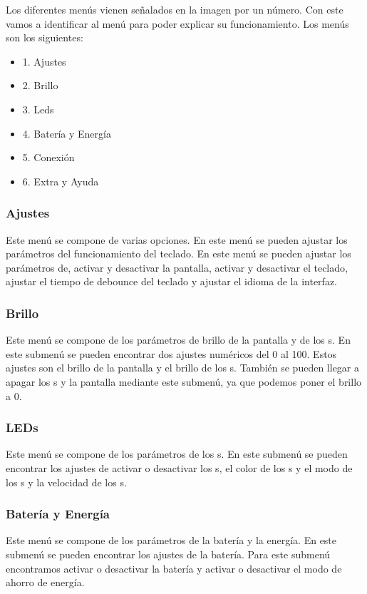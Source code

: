 Los diferentes menús vienen señalados en la imagen por un número. Con este vamos a identificar al menú para poder explicar su funcionamiento. Los menús son los siguientes:
\begin{itemize}
\item 1. Ajustes
\item 2. Brillo
\item 3. Leds
\item 4. Batería y Energía
\item 5. Conexión
\item 6. Extra y Ayuda
\end{itemize}

\subsubsection{Ajustes}
Este menú se compone de varias opciones. En este menú se pueden ajustar los parámetros del funcionamiento del teclado. En este menú se pueden ajustar los parámetros de, activar y desactivar la pantalla, activar y desactivar el teclado, ajustar el tiempo de debounce del teclado y ajustar el idioma de la interfaz.

\subsubsection{Brillo}
Este menú se compone de los parámetros de brillo de la pantalla y de los s. En este submenú se pueden encontrar dos ajustes numéricos del 0 al 100. Estos ajustes son el brillo de la pantalla y el brillo de los s. También se pueden llegar a apagar los s y la pantalla mediante este submenú, ya que podemos poner el brillo a 0.

\subsubsection{\gls{LED}s}
Este menú se compone de los parámetros de los s. En este submenú se pueden encontrar los ajustes de activar o desactivar los s, el color de los s y el modo de los s y la velocidad de los s.

\subsubsection{Batería y Energía}
Este menú se compone de los parámetros de la batería y la energía. En este submenú se pueden encontrar los ajustes de la batería. Para este submenú encontramos activar o desactivar la batería y activar o desactivar el modo de ahorro de energía.

